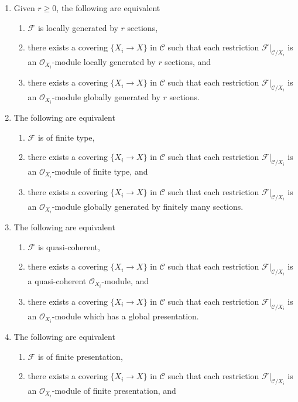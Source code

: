 \begin{lemma}
\begin{enumerate}
\item Given $r \geq 0$, the following are equivalent
\begin{enumerate}
\item $\mathcal{F}$ is locally generated by $r$ sections,
\item there exists a covering $\{X_i \to X\}$ in $\mathcal{C}$
such that each restriction $\mathcal{F}|_{\mathcal{C}/X_i}$
is an $\mathcal{O}_{X_i}$-module locally generated by $r$ sections, and
\item there exists a covering $\{X_i \to X\}$ in $\mathcal{C}$
such that each restriction $\mathcal{F}|_{\mathcal{C}/X_i}$
is an $\mathcal{O}_{X_i}$-module globally generated by $r$ sections.
\end{enumerate}
\item The following are equivalent
\begin{enumerate}
\item $\mathcal{F}$ is of finite type,
\item there exists a covering $\{X_i \to X\}$ in $\mathcal{C}$
such that each restriction $\mathcal{F}|_{\mathcal{C}/X_i}$
is an $\mathcal{O}_{X_i}$-module of finite type, and
\item there exists a covering $\{X_i \to X\}$ in $\mathcal{C}$
such that each restriction $\mathcal{F}|_{\mathcal{C}/X_i}$
is an $\mathcal{O}_{X_i}$-module globally generated by finitely many sections.
\end{enumerate}
\item The following are equivalent
\begin{enumerate}
\item $\mathcal{F}$ is quasi-coherent,
\item there exists a covering $\{X_i \to X\}$ in $\mathcal{C}$
such that each restriction $\mathcal{F}|_{\mathcal{C}/X_i}$
is a quasi-coherent $\mathcal{O}_{X_i}$-module, and
\item there exists a covering $\{X_i \to X\}$ in $\mathcal{C}$
such that each restriction $\mathcal{F}|_{\mathcal{C}/X_i}$
is an $\mathcal{O}_{X_i}$-module which has a global presentation.
\end{enumerate}
\item The following are equivalent
\begin{enumerate}
\item $\mathcal{F}$ is of finite presentation,
\item there exists a covering $\{X_i \to X\}$ in $\mathcal{C}$
such that each restriction $\mathcal{F}|_{\mathcal{C}/X_i}$
is an $\mathcal{O}_{X_i}$-module of finite presentation, and

\end{enumerate}
\end{enumerate}
\end{lemma}
